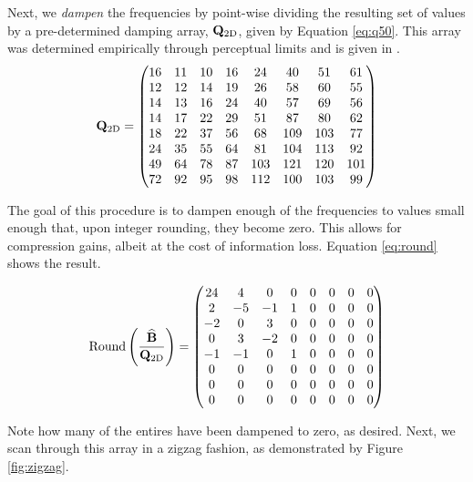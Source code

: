 Next, we {\em dampen} the frequencies by point-wise dividing the resulting set of values by a pre-determined damping array, $\mathbf{Q}_{\textrm{2D}}$, given by Equation \ref{eq:q50}. This array was determined empirically through perceptual limits and is given in \cite{wallace1992jpeg}.
\begin{equation}
	\mathbf{Q}_{\textrm{2D}} = \begin{pmatrix}
	16 & 11 & 10 & 16 & 24 & 40 & 51 & 61\\
	12 & 12 & 14 & 19 & 26 & 58 & 60 & 55\\
	14 & 13 & 16 & 24 & 40 & 57 & 69 & 56\\
	14 & 17 & 22 & 29 & 51 & 87 & 80 & 62\\
	18 & 22 & 37 & 56 & 68 & 109 & 103 & 77\\
	24 & 35 & 55 & 64 & 81 & 104 & 113 & 92\\
	49 & 64 & 78 & 87 & 103 & 121 & 120 & 101\\
	72 & 92 & 95 & 98 & 112 & 100 & 103 & 99	
	\end{pmatrix}
\label{eq:q50}	
\end{equation}

The goal of this procedure is to dampen enough of the frequencies to values small enough that, upon integer rounding, they become zero. This allows for compression gains, albeit at the cost of information loss. Equation \ref{eq:round} shows the result.

\begin{equation}
	\textnormal{Round}\left(\frac{\widehat{\mathbf{B}}}{\mathbf{Q}_{\textrm{2D}}}\right) = \begin{pmatrix}
	24 &	4 &	0 &	0 &	0 &	0 &	0 &	0\\
	2 &	-5 &	-1 &	1 &	0 &	0 &	0 &	0\\
	-2 &	0 &	3 &	0 &	0 &	0 &	0 &	0\\
	0 &	3 &	-2 &	0 &	0 &	0 &	0 &	0\\
	-1 &	-1 &	0 &	1 &	0 &	0 &	0 &	0\\
	0 &	0 &	0 &	0 &	0 &	0 &	0 &	0\\
	0 &	0 &	0 &	0 &	0 &	0 &	0 &	0\\
	0 &	0 &	0 &	0 &	0 &	0 &	0 &	0
	\end{pmatrix}
\label{eq:round}
\end{equation}

Note how many of the entires have been dampened to zero, as desired. Next, we scan through this array in a zigzag fashion, as demonstrated by Figure \ref{fig:zigzag}.

